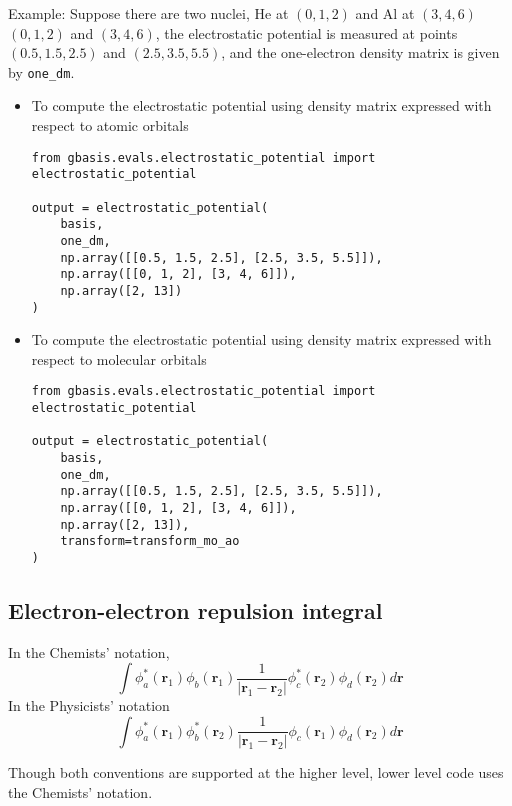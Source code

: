 \documentclass[letterpaper]{article}
\begin{document}
Example:
Suppose there are two nuclei, He at $(0, 1, 2)$ and Al at $(3, 4, 6)$
$(0, 1, 2)$ and $(3, 4, 6)$, the electrostatic potential is measured at
points $(0.5, 1.5, 2.5)$ and $(2.5, 3.5, 5.5)$, and the one-electron density
matrix is given by \verb|one_dm|.
\begin{itemize}
\item To compute the electrostatic potential using density matrix expressed with
  respect to atomic orbitals
  \begin{lstlisting}[xleftmargin=-25pt]
from gbasis.evals.electrostatic_potential import electrostatic_potential

output = electrostatic_potential(
    basis,
    one_dm,
    np.array([[0.5, 1.5, 2.5], [2.5, 3.5, 5.5]]),
    np.array([[0, 1, 2], [3, 4, 6]]),
    np.array([2, 13])
)
\end{lstlisting}
\item To compute the electrostatic potential using density matrix expressed with
  respect to molecular orbitals
  \begin{lstlisting}[xleftmargin=-25pt]
from gbasis.evals.electrostatic_potential import electrostatic_potential

output = electrostatic_potential(
    basis,
    one_dm,
    np.array([[0.5, 1.5, 2.5], [2.5, 3.5, 5.5]]),
    np.array([[0, 1, 2], [3, 4, 6]]),
    np.array([2, 13]),
    transform=transform_mo_ao
)
\end{lstlisting}
\end{itemize}
\subsection{Electron-electron repulsion integral}
In the Chemists' notation,
\begin{equation}
  \label{eq:elec_repulsion}
  \int \phi^*_a(\mathbf{r}_1) \phi_b(\mathbf{r}_1)
  \frac{1}{|\mathbf{r}_1 - \mathbf{r}_2|}
  \phi^*_c(\mathbf{r}_2) \phi_d(\mathbf{r}_2) d\mathbf{r}
\end{equation}
In the Physicists' notation
\begin{equation}
  \label{eq:elec_repulsion_phys}
  \int \phi^*_a(\mathbf{r}_1) \phi^*_b(\mathbf{r}_2)
  \frac{1}{|\mathbf{r}_1 - \mathbf{r}_2|}
  \phi_c(\mathbf{r}_1) \phi_d(\mathbf{r}_2) d\mathbf{r}
\end{equation}

Though both conventions are supported at the higher level, lower level code uses
the Chemists' notation.
\end{document}

